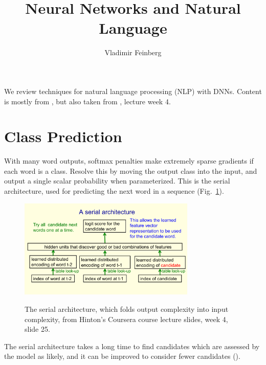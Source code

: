 \documentclass{article}
\title{Neural Networks and Natural Language}
\author{Vladimir Feinberg}
\begin{document}
\maketitle

We review techniques for natural language processing (NLP) with DNNs. Content is mostly from , but also taken from , lecture week 4.

\section{Class Prediction}

With many word outputs, softmax penalties make extremely sparse gradients if each word is a class. Resolve this by moving the output class into the input, and output a single scalar probability when parameterized. This is the serial architecture, used for predicting the next word in a sequence (Fig.~\ref{fig:serial}).
\begin{figure}[!h]
\centering
{\includegraphics[width=0.75\textwidth]{hinton-serial.pdf}}
  \caption{The serial architecture, which folds output complexity into input complexity, from Hinton's Coursera course lecture slides, week 4, slide 25.}
\label{fig:serial}
\end{figure}
The serial architecture takes a long time to find candidates which are assessed by the model as likely, and it can be improved to consider fewer candidates ().
\end{document}
